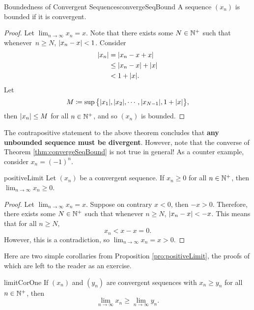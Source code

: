 \documentclass[math]{amznotes}
\theoremstyle{remark}
\begin{document}
\begin{thmbox}{Boundedness of Convergent Sequences}{convergeSeqBound}
    A sequence $(x_n)$ is bounded if it is convergent.
    \tcblower
    \begin{proof}
        Let $\lim_{n \to \infty}x_n = x$. Note that there exists some $N \in \mathbb{N}^+$ such that whenever~$n \geq N$, ${\left\lvert {x_n - x} \right\rvert} < 1$. Consider
        \begin{align*}
            {\left\lvert {x_n} \right\rvert} & = {\left\lvert {x_n - x + x} \right\rvert} \\
            & \leq {\left\lvert {x_n - x} \right\rvert} + {\left\lvert {x} \right\rvert} \\
            & < 1 + {\left\lvert {x} \right\rvert}.
        \end{align*}
        Let
        \begin{equation*}
            M \coloneqq \sup \big\{{\left\lvert {x_1} \right\rvert}, {\left\lvert {x_2} \right\rvert}, \cdots, {\left\lvert {x_{N - 1}} \right\rvert}, 1 + {\left\lvert {x} \right\rvert}\big\},
        \end{equation*}
        then ${\left\lvert {x_n} \right\rvert} \leq M$ for all $n \in \mathbb{N}^+$, and so $(x_n)$ is bounded.
    \end{proof}
\end{thmbox}
The contrapositive statement to the above theorem concludes that \textbf{any unbounded sequence must be divergent}. However, note that the converse of Theorem \ref{thm:convergeSeqBound} is not true in general! As a counter example, consider $x_n = (-1)^n$.
\begin{probox}{}{positiveLimit}
    Let $(x_n)$ be a convergent sequence. If $x_n \geq 0$ for all $n \in \mathbb{N}^+$, then $\lim_{n \to \infty}x_n \geq 0$.
    \tcblower
    \begin{proof}
        Let $\lim_{n \to \infty}x_n = x$. Suppose on contrary $x < 0$, then $-x > 0$. Therefore, there exists some $N \in \mathbb{N}^+$ such that whenever $n \geq N$, ${\left\lvert {x_n - x} \right\rvert} < -x$. This means that for all $n \geq N$,
        \begin{equation*}
            x_n < x - x = 0.
        \end{equation*}
        However, this is a contradiction, so $\lim_{n \to \infty}x_n = x > 0$.
    \end{proof}
\end{probox}
Here are two simple corollaries from Proposition \ref{pro:positiveLimit}, the proofs of which are left to the reader as an exercise.
\begin{corbox}{}{limitCorOne}
    If $(x_n)$ and $(y_n)$ are convergent sequences with $x_n \geq y_n$ for all $n \in \mathbb{N}^+$, then
    \begin{equation*}
        \lim_{n \to \infty}x_n \geq \lim_{n \to \infty}y_n.
    \end{equation*}
\end{corbox}
\end{document}
